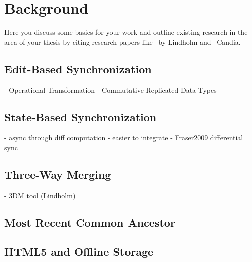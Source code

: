 
\chapter{Background}\label{background}

Here you discuss some basics for your work and outline existing research in the area of your thesis by citing research papers like~\cite{Lindholm:2009wo} by Lindholm and~\cite{DeCandia:2007ui,Ratner:2001wz} Candia.

\section{Edit-Based Synchronization}
- Operational Transformation
- Commutative Replicated Data Types

\section{State-Based Synchronization}
- async through diff computation
- easier to integrate
- Fraser2009 differential sync

\section{Three-Way Merging}
- 3DM tool (Lindholm)

\section{Most Recent Common Ancestor}

\section{HTML5 and Offline Storage}
